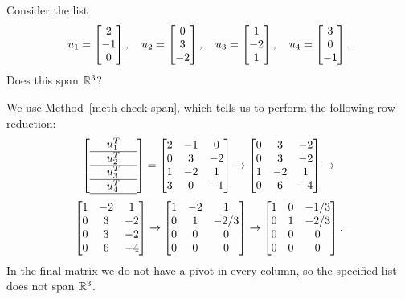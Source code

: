 \documentclass[a4paper]{amsart}
\renewenvironment{solution}{\SolutionInline}{\endSolutionInline}
\begin{document}
\begin{exercise}\label{ex-fullspan-i}
 Consider the list
 \[ u_1 = \left[\begin{matrix} 2 \\ -1 \\ 0 \end{matrix}\right], \quad
    u_2 = \left[\begin{matrix} 0 \\ 3 \\ -2 \end{matrix}\right], \quad
    u_3 = \left[\begin{matrix} 1 \\ -2 \\ 1 \end{matrix}\right], \quad
    u_4 = \left[\begin{matrix} 3 \\ 0 \\ -1 \end{matrix}\right]. 
 \]
 Does this span ${\mathbb{R}}^3$?
\end{exercise}
\begin{solution}
 We use Method~\ref{meth-check-span}, which tells us to perform the
 following row-reduction:
 \[ 
   \left[\begin{array}{ccc}
    & u_1^T & \\ \hline
    & u_2^T & \\ \hline
    & u_3^T & \\ \hline
    & u_4^T & \\ \hline
   \end{array}\right]
   = 
   \left[\begin{matrix} 
    2 & -1 &  0 \\
    0 &  3 & -2 \\
    1 & -2 &  1 \\
    3 &  0 & -1 
   \end{matrix}\right] 
   \to 
   \left[\begin{matrix} 
    0 &  3 & -2 \\
    0 &  3 & -2 \\
    1 & -2 &  1 \\
    0 &  6 & -4 
   \end{matrix}\right] 
   \to 
 \] \[
   \left[\begin{matrix} 
    1 & -2 &  1 \\
    0 &  3 & -2 \\
    0 &  3 & -2 \\
    0 &  6 & -4 
   \end{matrix}\right] 
   \to 
   \left[\begin{matrix} 
    1 & -2 &  1 \\
    0 &  1 & -2/3 \\
    0 &  0 & 0 \\
    0 &  0 & 0 
   \end{matrix}\right] 
   \to 
   \left[\begin{matrix} 
    1 &  0 & -1/3 \\
    0 &  1 & -2/3 \\
    0 &  0 & 0 \\
    0 &  0 & 0 
   \end{matrix}\right]. 
 \]
 In the final matrix we do not have a pivot in every column, so the
 specified list does not span ${\mathbb{R}}^3$.  
\end{solution}
\end{document}
